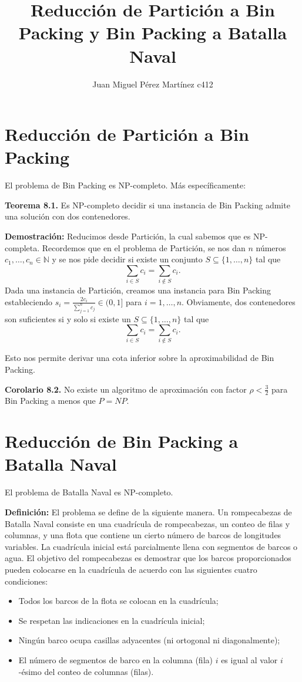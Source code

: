 \documentclass{article}
\title{Reducción de Partición a Bin Packing y Bin Packing a Batalla Naval}
\author{Juan Miguel Pérez Martínez c412}
\begin{document}
\maketitle

\section{Reducción de Partición a Bin Packing}

El problema de Bin Packing es NP-completo. Más específicamente:

\textbf{Teorema 8.1.} Es NP-completo decidir si una instancia de Bin Packing admite una solución con dos contenedores.

\textbf{Demostración:} Reducimos desde Partición, la cual sabemos que es NP-completa. Recordemos que en el problema de Partición, se nos dan $n$ números $c_1, \dots, c_n \in \mathbb{N}$ y se nos pide decidir si existe un conjunto $S \subseteq \{1, \dots, n\}$ tal que
\[
\sum_{i \in S} c_i = \sum_{i \notin S} c_i.
\]
Dada una instancia de Partición, creamos una instancia para Bin Packing estableciendo $s_i = \frac{2c_i}{\sum_{j=1}^{n} c_j} \in (0, 1]$ para $i = 1, \dots, n$. Obviamente, dos contenedores son suficientes si y solo si existe un $S \subseteq \{1, \dots, n\}$ tal que
\[
\sum_{i \in S} c_i = \sum_{i \notin S} c_i.
\]

Esto nos permite derivar una cota inferior sobre la aproximabilidad de Bin Packing.

\textbf{Corolario 8.2.} No existe un algoritmo de aproximación con factor $\rho < \frac{3}{2}$ para Bin Packing a menos que $P = NP$.

\section{Reducción de Bin Packing a Batalla Naval}

El problema de Batalla Naval es NP-completo.

\textbf{Definición:} El problema se define de la siguiente manera. Un rompecabezas de Batalla Naval consiste en una cuadrícula de rompecabezas, un conteo de filas y columnas, y una flota que contiene un cierto número de barcos de longitudes variables. La cuadrícula inicial está parcialmente llena con segmentos de barcos o agua. El objetivo del rompecabezas es demostrar que los barcos proporcionados pueden colocarse en la cuadrícula de acuerdo con las siguientes cuatro condiciones:
\begin{itemize}
    \item Todos los barcos de la flota se colocan en la cuadrícula;
    \item Se respetan las indicaciones en la cuadrícula inicial;
    \item Ningún barco ocupa casillas adyacentes (ni ortogonal ni diagonalmente);
    \item El número de segmentos de barco en la columna (fila) $i$ es igual al valor $i$-ésimo del conteo de columnas (filas).
\end{itemize}
\end{document}

